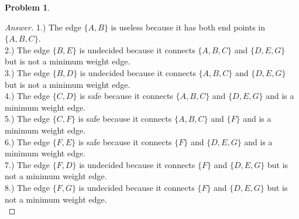 \documentclass[11pt]{article}
\theoremstyle{definition}
\theoremstyle{definition}
\newtheorem{required}{Problem}
\theoremstyle{definition}
\begin{document}
\begin{required}
\begin{proof}[Answer]
1.) The edge $\{A, B\}$ is useless because it has both end points in $\{A, B, C\}$.\\

2.) The edge $\{B, E\}$ is undecided because it connects  $\{A, B, C\}$ and $\{D, E, G\}$ but is not a minimum weight edge.\\

3.) The edge $\{B, D\}$ is undecided because it connects  $\{A, B, C\}$ and $\{D, E, G\}$ but is not a minimum weight edge.\\

4.) The edge $\{C, D\}$ is safe because it connects  $\{A, B, C\}$ and $\{D, E, G\}$ and is a minimum weight edge.\\

5.) The edge $\{C, F\}$ is safe because it connects $\{A, B, C\}$ and $\{F\}$ and is a minimum weight edge.\\

6.) The edge $\{F, E\}$ is safe because it connects  $\{F\}$ and $\{D, E, G\}$ and is a minimum weight edge.\\

7.) The edge $\{F, D\}$ is undecided because it connects  $\{F\}$ and $\{D, E, G\}$ but is not a minimum weight edge.\\

8.) The edge $\{F, G\}$ is undecided because it connects  $\{F\}$ and $\{D, E, G\}$ but is not a minimum weight edge.\\
\end{proof}





\end{required}
\end{document}
